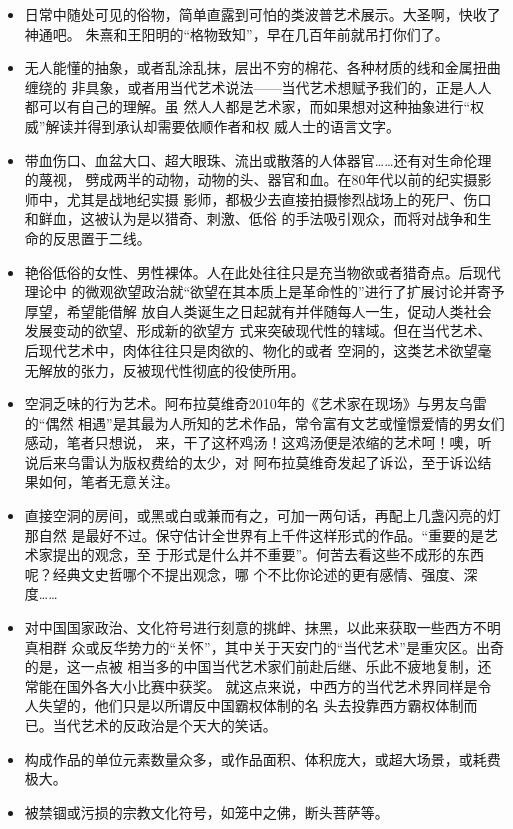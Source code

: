 \begin{itemize}

\item 日常中随处可见的俗物，简单直露到可怕的类波普艺术展示。大圣啊，快收了神通吧。
朱熹和王阳明的“格物致知”，早在几百年前就吊打你们了。

\item 无人能懂的抽象，或者乱涂乱抹，层出不穷的棉花、各种材质的线和金属扭曲缠绕的
非具象，或者用当代艺术说法——当代艺术想赋予我们的，正是人人都可以有自己的理解。虽
然人人都是艺术家，而如果想对这种抽象进行“权威”解读并得到承认却需要依顺作者和权
威人士的语言文字。
  
\item 带血伤口、血盆大口、超大眼珠、流出或散落的人体器官……还有对生命伦理的蔑视，
劈成两半的动物，动物的头、器官和血。在80年代以前的纪实摄影师中，尤其是战地纪实摄
影师，都极少去直接拍摄惨烈战场上的死尸、伤口和鲜血，这被认为是以猎奇、刺激、低俗
的手法吸引观众，而将对战争和生命的反思置于二线。

\item 艳俗低俗的女性、男性裸体。人在此处往往只是充当物欲或者猎奇点。后现代理论中
的微观欲望政治就“欲望在其本质上是革命性的”进行了扩展讨论并寄予厚望，希望能借解
放自人类诞生之日起就有并伴随每人一生，促动人类社会发展变动的欲望、形成新的欲望方
式来突破现代性的辖域。但在当代艺术、后现代艺术中，肉体往往只是肉欲的、物化的或者
空洞的，这类艺术欲望毫无解放的张力，反被现代性彻底的役使所用。

\item 空洞乏味的行为艺术。阿布拉莫维奇2010年的《艺术家在现场》与男友乌雷的“偶然
相遇”是其最为人所知的艺术作品，常令富有文艺或憧憬爱情的男女们感动，笔者只想说，
来，干了这杯鸡汤！这鸡汤便是浓缩的艺术呵！噢，听说后来乌雷认为版权费给的太少，对
阿布拉莫维奇发起了诉讼，至于诉讼结果如何，笔者无意关注。
  
\item 直接空洞的房间，或黑或白或兼而有之，可加一两句话，再配上几盏闪亮的灯那自然
是最好不过。保守估计全世界有上千件这样形式的作品。“重要的是艺术家提出的观念，至
于形式是什么并不重要”。何苦去看这些不成形的东西呢？经典文史哲哪个不提出观念，哪
个不比你论述的更有感情、强度、深度……

\item 对中国国家政治、文化符号进行刻意的挑衅、抹黑，以此来获取一些西方不明真相群
众或反华势力的“关怀”，其中关于天安门的“当代艺术”是重灾区。出奇的是，这一点被
相当多的中国当代艺术家们前赴后继、乐此不疲地复制，还常能在国外各大小比赛中获奖。
就这点来说，中西方的当代艺术界同样是令人失望的，他们只是以所谓反中国霸权体制的名
头去投靠西方霸权体制而已。当代艺术的反政治是个天大的笑话。

\item 构成作品的单位元素数量众多，或作品面积、体积庞大，或超大场景，或耗费极大。

\item 被禁锢或污损的宗教文化符号，如笼中之佛，断头菩萨等。

\end{itemize}


